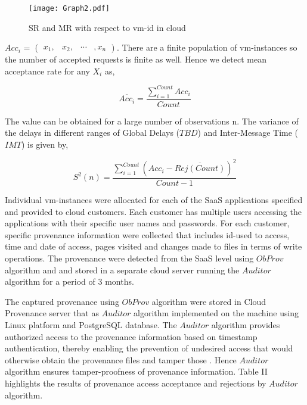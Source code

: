 \documentclass[conference]{IEEEtran}
\begin{document}
\begin{figure}[t!]
\centering
\texttt{[image: Graph2.pdf]}
\caption{SR and MR with respect to vm-id in cloud}
\label{figure10}
\end{figure}

$Acc_{i}$ = \begin{math}
  \begin{pmatrix}
    x_{1},&x_{2},&\cdots&,x_{n}
  \end{pmatrix}
\end{math}. There are a finite population of vm-instances so the number of accepted requests is finite as well. Hence we detect mean acceptance rate for any $X_{i}$ as,

\begin{equation}\overline{Acc_{i}} = \frac{\sum_{i=1}^{Count} Acc_{i}}{Count}\end{equation}

The value can be obtained for a large number of observations n. The variance of the delays in different ranges of Global Delays ($TBD$) and Inter-Message Time ($IMT$) is given by,

\begin{equation}{S^2(n)} = \frac{\sum_{i=1}^{Count} (Acc_{i}-\overline{Rej(Count)})^2}{Count-1}\end{equation}

Individual vm-instances were allocated for each of the SaaS applications specified and provided to cloud customers. Each customer has multiple users accessing the applications with their specific user names and passwords. For each customer, specific provenance information were collected that includes id-used to access, time and date of access, pages visited and changes made to files in terms of write operations. The provenance were detected from the SaaS level using $ObProv$ algorithm and and stored in a separate cloud server running the $Auditor$ algorithm for a period of 3 months.



The captured provenance using $ObProv$ algorithm were stored in Cloud Provenance server that as $Auditor$ algorithm implemented on the machine using Linux platform and PostgreSQL database. The $Auditor$ algorithm provides authorized access to the provenance information based on timestamp authentication, thereby enabling the prevention of undesired access that would otherwise obtain the provenance files and tamper those \cite{imran2014active}. Hence $Auditor$ algorithm ensures tamper-proofness of provenance information. Table II highlights the results of provenance access acceptance and rejections by $Auditor$ algorithm.
\end{document}
